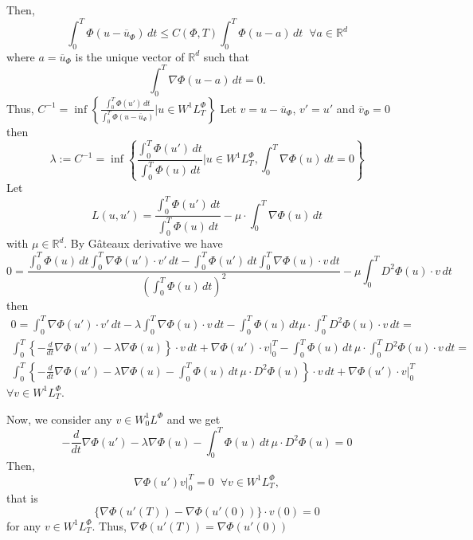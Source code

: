 \documentclass[twoside]{article}
\theoremstyle{remark}
\newcommand{\lphi}{L^{\Phi}}
\newcommand{\wphit}{W^{1}\lphi_T}
\newcommand{\rr}{\mathbb{R}}
\renewcommand{\leq}{\leqslant}
\begin{document}
Then, 
\begin{equation}
\int_0^T \Phi(u-\overline{u}_{\Phi})\,dt\leq
C(\Phi, T) \int_0^T\Phi(u-a)\,dt\;\; \forall a  \in \rr^d 
\end{equation}
where $a=\overline{u}_{\Phi}$ is the unique vector of $\rr^d$ such that
\begin{equation}
\int_0^T \nabla \Phi(u-a)\,dt=0.
\end{equation}  
Thus, 
$C^{-1}=\inf\left\{
\frac{\int_0^T \Phi(u')\,dt}{\int_0^T \Phi(u-\overline{u}_{\Phi})}| u \in \wphit
\right\}$
Let $v=u-\overline{u}_{\Phi}$, $v'=u'$ and $\overline{v}_{\Phi}=0$ then
\begin{equation}
\lambda:=C^{-1}=\inf \left\{
\frac{\int_0^T \Phi(u')\,dt}{\int_0^T \Phi(u)\,dt}|u \in \wphit, \int_0^T \nabla \Phi(u)\,dt=0
\right\}
\end{equation}
Let 
\begin{equation}
L(u,u')=\frac{\int_0^T \Phi(u')\,dt}{\int_0^T \Phi(u)\,dt}-\mu \cdot\int_0^T \nabla \Phi(u)\,dt
\end{equation}
with $\mu \in \rr^d$. 
By G\^ateaux derivative we have
\begin{equation}
0=\frac{\int_0^T \Phi(u)\,dt \int_0^T \nabla\Phi(u')\cdot v'\,dt-
\int_0^T \Phi(u')\,dt \int_0^T \nabla \Phi(u)\cdot v\,dt}{(\int_0^T \Phi(u)\,dt)^2}-\mu \int_0^T D^2\Phi(u)\cdot v \,dt
\end{equation}
then 
\begin{equation}
\begin{split}
0=\int_0^T \nabla\Phi(u')\cdot v'\,dt-\lambda \int_0^T \nabla \Phi(u)\cdot v\,dt-
\int_0^T \Phi(u)\,dt \mu \cdot\int_0^T D^2\Phi(u)\cdot v \,dt=
\\
\int_0^T \left\{
-\frac{d}{dt}\nabla\Phi(u')-\lambda \nabla\Phi(u)
\right\} \cdot v\,dt+\nabla\Phi(u')\cdot v|_0^T-\int_0^T \Phi(u)\,dt\, \mu \cdot\int_0^T D^2\Phi(u)\cdot v \,dt=
\\
\int_0^T \left\{
-\frac{d}{dt}\nabla\Phi(u')-\lambda \nabla\Phi(u)
 -\int_0^T \Phi(u)\,dt \,\mu \cdot D^2\Phi(u)\right\}\cdot v \,dt+\nabla\Phi(u')\cdot v|_0^T
\end{split}
\end{equation}
$\forall v \in \wphit$. 

Now, we consider any $v \in W_0^1L^{\Phi}$ and we get
\begin{equation}\label{eq:ed-phi-aniso}
-\frac{d}{dt}\nabla\Phi(u')-\lambda \nabla\Phi(u)
 -\int_0^T \Phi(u)\,dt\, \mu \cdot D^2\Phi(u)=0
\end{equation}
Then, 
\[
 \nabla\Phi(u') v|_0^T=0\;\;\forall v \in \wphit,
\]
that is
\[
 \{\nabla\Phi(u'(T))-\nabla\Phi(u'(0))\}\cdot v(0)=0
\]
for any $v \in \wphit$. 
Thus,  $\nabla\Phi(u'(T))=\nabla\Phi(u'(0))$
\end{document}
